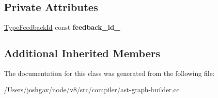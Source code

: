 \subsection*{Private Attributes}
\begin{DoxyCompactItemize}
\item 
\hyperlink{classv8_1_1internal_1_1_type_feedback_id}{Type\+Feedback\+Id} const {\bfseries feedback\+\_\+id\+\_\+}\hypertarget{classv8_1_1internal_1_1compiler_1_1_ast_graph_builder_1_1_ast_test_context_ad621abf3aab5ebf07e1d620b4964b83a}{}\label{classv8_1_1internal_1_1compiler_1_1_ast_graph_builder_1_1_ast_test_context_ad621abf3aab5ebf07e1d620b4964b83a}

\end{DoxyCompactItemize}
\subsection*{Additional Inherited Members}


The documentation for this class was generated from the following file\+:\begin{DoxyCompactItemize}
\item 
/\+Users/joshgav/node/v8/src/compiler/ast-\/graph-\/builder.\+cc\end{DoxyCompactItemize}

